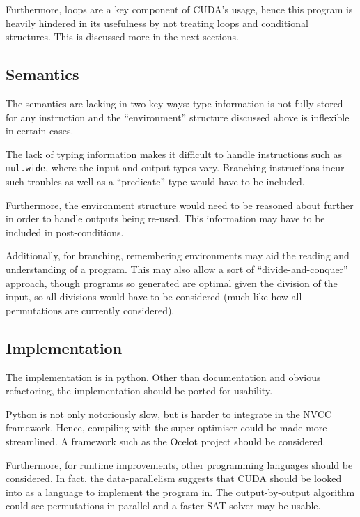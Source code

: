\documentclass[letterpaper,twocolumn,10pt]{article}
\begin{document}
Furthermore, loops are a key component of CUDA's usage, hence this program
is heavily hindered in its usefulness by not treating loops and conditional
structures. This is discussed more in the next sections.

\subsection{Semantics}

The semantics are lacking in two key ways: type information is not fully
stored for any instruction and the ``environment'' structure discussed
above is inflexible in certain cases.

The lack of typing information makes it difficult to handle instructions such
as \texttt{mul.wide}, where the input and output types vary. Branching instructions
incur such troubles as well as a ``predicate'' type would have to be included.

Furthermore, the environment structure would need to be reasoned about further
in order to handle outputs being re-used. This information may have to be
included in post-conditions.

Additionally, for branching, remembering environments may aid the reading
and understanding of a program.
This may also allow a sort of ``divide-and-conquer'' approach, though programs
so generated are optimal given the division of the input, so all divisions would
have to be considered (much like how all permutations are currently considered).

\subsection{Implementation}

The implementation is in python. Other than documentation and obvious
refactoring, the implementation should be ported for usability.

Python is not only notoriously slow, but is harder to integrate in the
NVCC framework. Hence, compiling with the super-optimiser could be made more
streamlined. A framework such as \cite{GPUOcelot} the Ocelot project
should be considered.

Furthermore, for runtime improvements, other programming languages should be
considered. In fact, the data-parallelism suggests that CUDA should be looked into
as a language to implement the program in. The output-by-output algorithm
could see permutations in parallel and a faster SAT-solver may be usable.
\end{document}
